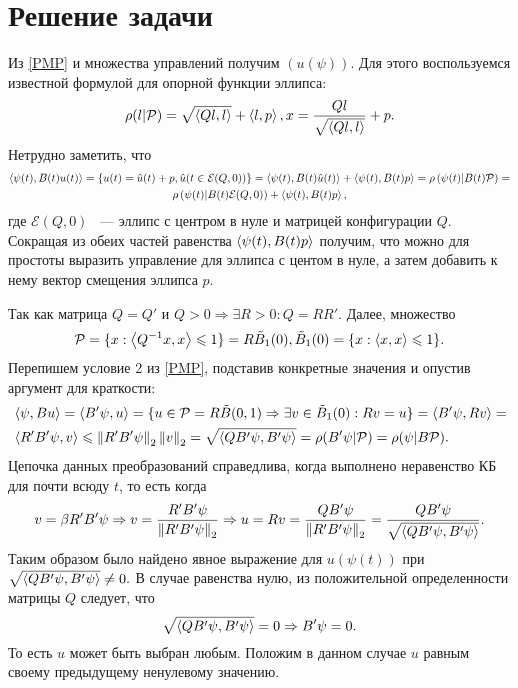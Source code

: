 \documentclass[11pt]{article}
\begin{document}
\section{Решение задачи}
Из \eqref{PMP} и множества управлений получим $(u(\psi)).$ Для этого воспользуемся известной формулой для
опорной функции эллипса: 
\[
\rho(l | \mathcal{P}) = \sqrt{\left<Ql,l\right>} + \left<l,p\right>, x = \frac{Ql}{\sqrt{\left<Ql,l\right>}} + p.
\]
Нетрудно заметить, что 
\begin{multline*}
\left<\psi(t), B(t)u(t)\right> = \{u(t) = \hat u(t) + p, \hat u(t \in \mathcal{E}(Q, 0))   \} = 
\left<\psi(t), B(t)\hat u(t)\right> + \left<\psi(t),B(t)p\right> = \rho \left(\psi(t) | B(t)\mathcal{P}\right) = 
\\
\rho \left(\psi(t) | B(t)\mathcal{E}(Q, 0) \right) + \left<\psi(t),B(t)p\right>,
\end{multline*}
где $\mathcal{E}(Q, 0) $ ~--- эллипс с центром в нуле и матрицей конфигурации $Q.$ Сокращая из обеих частей равенства 
$\left<\psi(t),B(t)p\right>$ получим, что можно для простоты выразить управление для эллипса с центом в нуле, а затем добавить к нему 
вектор смещения эллипса $p.$

Так как матрица $Q = Q'$ и $Q > 0 \Rightarrow \exists R > 0 : Q = RR'.$
Далее, множество 
\[
\mathcal{P} = \{x: \left<Q^{-1}x,x\right> \leqslant 1  \} = R\tilde{B}_1(0), \tilde{B}_1(0) = \{x : \left<x,x\right> \leqslant 1 \}.
\] 
Перепишем условие 2 из \eqref{PMP}, подставив конкретные значения и опустив аргумент для краткости:
\[
\begin{aligned}
& \left<\psi,Bu\right> = \left<B'\psi,u\right> = \{u \in \mathcal{P} = R\tilde{B}(0, 1) \Rightarrow
\exists v \in \tilde{B}_1(0) : Rv = u\} = \left<B'\psi,Rv\right> =
\\ 
&\left<R'B'\psi,v\right> \leqslant
\left\lVert R'B'\psi \right\rVert_2\left\lVert v \right\rVert_2 = \sqrt{\left<QB'\psi,B'\psi\right>} = \rho(B'\psi |\mathcal{P}) = \rho(\psi | B \mathcal{P}).
\end{aligned}
\]
Цепочка данных преобразований справедлива, когда выполнено неравенство КБ для почти всюду $t$, то есть когда 
\[
v = \beta R'B'\psi \Rightarrow 
v = \frac{R'B'\psi}{\left\lVert R'B'\psi \right\rVert_2} \Rightarrow u = Rv = \frac{QB'\psi}{\left\lVert R'B'\psi \right\rVert_2} = \frac{QB'\psi}{\sqrt{\left<QB'\psi,B'\psi\right>}}.
\]
Таким образом было найдено явное выражение для $u(\psi(t))$ при \( \sqrt{\left<QB'\psi,B'\psi\right>} \ne 0 .\)
В случае равенства нулю, из положительной определенности матрицы $Q$ следует, что 
\[ \sqrt{\left<QB'\psi,B'\psi\right>} = 0 \Rightarrow B'\psi = 0.\]
То есть \(u\) может быть выбран любым. Положим в данном случае
\(u\) равным своему предыдущему ненулевому значению.
\end{document}
